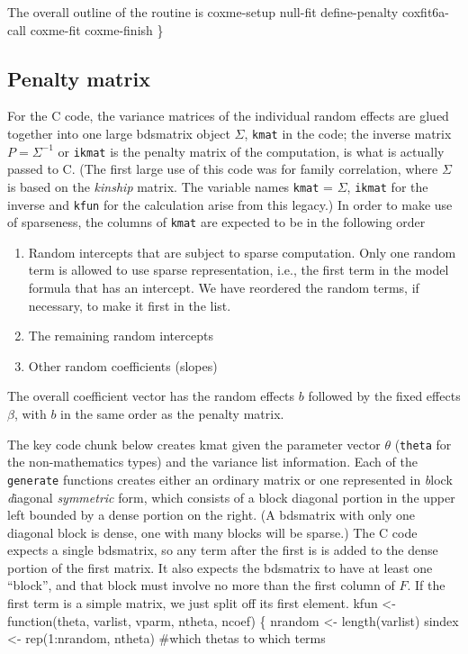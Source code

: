 \documentclass{article}
\begin{document}
The overall outline of the routine is
\nwenddocs{}\endmoddef
\LA{}coxme-setup\RA{}
    \LA{}null-fit\RA{}
    \LA{}define-penalty\RA{}
    \LA{}coxfit6a-call\RA{}
    \LA{}coxme-fit\RA{}
    \LA{}coxme-finish\RA{}
\}
\nwendcode{}\nwdocspar

\subsection{Penalty matrix}
For the C code, the variance matrices of the individual
random effects are glued together into one
large bdsmatrix object $\Sigma$, {\tt{}kmat} in the code; 
the inverse matrix $P = \Sigma^{-1}$ or 
{\tt{}ikmat} is the penalty matrix of the computation,
is what is actually passed to C.
(The first large use of this code was for family correlation, where
$\Sigma$ is based on the \emph{kinship} matrix.  The variable names
{\tt{}kmat} = $\Sigma$, {\tt{}ikmat} for the inverse and {\tt{}kfun} for
the calculation arise from this legacy.)
In order to make use of sparseness, 
the columns of {\tt{}kmat} are expected to be in the following order
\begin{enumerate}
\item Random intercepts that are subject to sparse computation.
Only one random term is allowed to use sparse representation, i.e., the
first term in the model formula that has an intercept.
We have reordered the random terms, if necessary, to make it first in the list.
\item The remaining random intercepts
\item Other random coefficients (slopes)
\end{enumerate}
The overall coefficient vector has the random effects $b$ followed
by the fixed effects $\beta$,
with $b$ in the same order as the penalty matrix.

The key code chunk below creates kmat given the parameter vector $\theta$
({\tt{}theta} for the non-mathematics types) and the variance list information.
Each of the {\tt{}generate} functions creates either an ordinary matrix or
one represented in \emph{b}lock \emph{d}iagonal \emph{symmetric} form,
which consists of a block diagonal portion in the upper left bounded by a
dense portion on the right.
(A bdsmatrix with only one diagonal block is dense, one with many blocks
will be sparse.)
The C code expects a single bdsmatrix, so any term after the first is
is added to the dense portion of the first matrix.
It also expects the bdsmatrix to have at least one ``block'', and that
block must involve no more than the first column of $F$.
If the first term is a simple matrix, we just split off its first
element.
\nwenddocs{}\endmoddef
kfun <- function(theta, varlist, vparm, ntheta, ncoef) \{
    nrandom <- length(varlist)
    sindex <- rep(1:nrandom, ntheta) #which thetas to which terms
\end{document}
